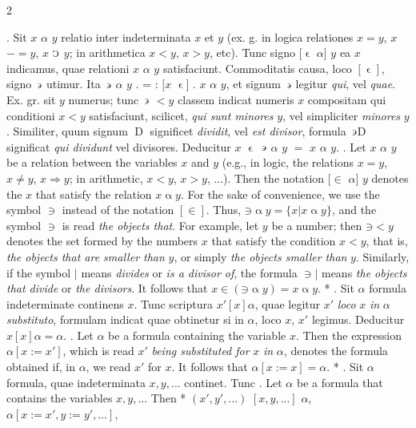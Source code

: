 \documentclass{book}
\newcommand{\C}{\mathop{\sbox0{$\displaystyle$$\reflectbox{C}$} %
\raisebox{-\height+\ht0-0.05cm}[\ht0][\dp0]{\scalebox{0.8}[0.8]{\copy0}}}\displaylimits} %
\newcommand{\such}{\thinspace \rotatebox[origin=c]{180}{$\epsilon$}}
\newcommand{\smallIn}{\ensuremath{\mathrel{\epsilon}}}
\newcommand{\D}{\mathrel{\text{D}}}
\renewcommand{\rightarrow}{\Rightarrow}
\newenvironment{translateTwoCol}
               { %
                 \columnratio{0.5, 0.5}
                 \begin{paracol}{2}
                 \newcommand{\LAT}{\switchcolumn[0]*}
                 \newcommand{\ENG}{\switchcolumn[1]}
               }
               { %
                 \let\ENG\undefined
                 \let\LAT\undefined
                 \end{paracol}
               }
\begin{document}
\begin{translateTwoCol}
. Sit $x$ $\alpha$ $y$ relatio inter indeterminata $x$ et $y$ (ex. g. in logica relationes $x = y$, $x$ $- = y$, $x$ $\C$ $y$; in arithmetica $x < y$, $x > y$, etc). Tunc signo $[\smallIn$ $\alpha]$ $y$ ea $x$ indicamus, quae relationi $x$ $\alpha$ $y$ satisfaciunt. Commoditatis causa, loco $[\smallIn]$, signo $\such$ utimur. Ita $\such$ $\alpha$ $y$ . = : $[x$ $\smallIn ]$ . $x$ $\alpha$ $y$, et signum $\such$ legitur \emph{qui}, vel \emph{quae}. Ex. gr. sit $y$ numerus; tunc $\such$ $< y$ classem indicat numeris $x$ compositam qui conditioni $x<y$ satisfaciunt, scilicet, \emph{qui sunt minores} $y$, vel simpliciter \emph{minores} $y$. Similiter, quum signum $\D$ significet \emph{dividit}, vel \emph{est divisor}, formula $\such$D significat \emph{qui dividunt} vel {divisores}. Deducitur $x$ $\smallIn$ $\such$ $\alpha$ $y$ $=$ $x$ $\alpha$ $y$.
\ENG
{}. Let $x$ $\alpha$ $y$ be a relation between the variables $x$ and $y$ (e.g., in logic, the relations $x = y$, $x \not= y$, $x \rightarrow y$; in arithmetic, $x < y$, $x > y$, ...). Then the notation $[\in$ $\alpha]$ $y$ denotes the $x$ that satisfy the relation $x \mathbin{\alpha} y$. For the sake of convenience, we use the symbol $\ni$ instead of the notation $[\in]$. Thus, $\mathord{\ni} \mathbin{\alpha} y = \{ x | x \mathbin{\alpha} y \}$, and the symbol $\ni$ is read \emph{the objects that}. For example, let $y$ be a number; then $\mathord{\ni} < y$ denotes the set formed by the numbers $x$ that satisfy the condition $x<y$, that is, \emph{the objects that are smaller than} $y$, or simply \emph{the objects smaller than} $y$. Similarly, if the symbol $|$ means \emph{divides} or \emph{is a divisor of}, the formula $\ni|$ means \emph{the objects that divide} or \emph{the divisors}. It follows that $x \in (\mathord{\ni} \mathbin{\alpha} y) = x \mathbin{\alpha} y$.   %
\LAT
{}. Sit $\alpha$ formula indeterminate continens $x$. Tunc scriptura $x' [x] \alpha$, quae legitur $x'$ \emph{loco} $x$ \emph{in} $\alpha$ \emph{substituto}, formulam indicat quae obtinetur si in $\alpha$, loco $x$, $x'$ legimus. Deducitur $x [x] \alpha = \alpha$.
\ENG
{}. Let $\alpha$ be a formula containing the variable $x$. Then the expression $\alpha [ x := x' ]$, which is read $x'$ \emph{being substituted for} $x$ \emph{in} $\alpha$, denotes the formula obtained if, in $\alpha$, we read $x'$ for $x$. It follows that $\alpha[x := x] = \alpha$.
\LAT
{}. Sit $\alpha$ formula, quae indeterminata $x,y,...$ continet. Tunc
\ENG
{}. Let $\alpha$ be a formula that contains the variables $x,y,...$ Then
\LAT
\hspace{1.06cm} $(x',y',...)$ $[x,y,...]$ $\alpha$,
\ENG
\hspace{1.06cm} $\alpha[x:=x', y:=y', \ldots]$,
\end{translateTwoCol}
\end{document}
